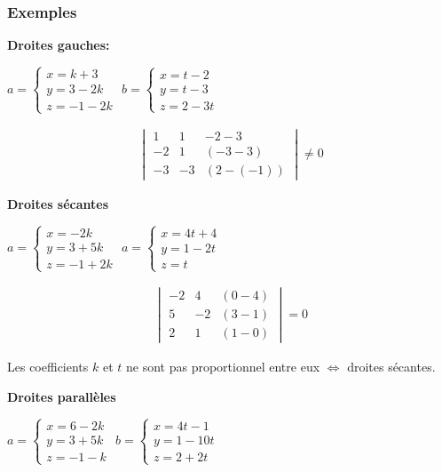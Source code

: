 \documentclass[12pt,a4paper]{report}
\begin{document}
	
	\subsubsection*{Exemples}
	\textbf{Droites gauches:}
	
	$a=\left\{
	\begin{array}{l}
	x=k+3 \\
	y=3-2k \\
	z=-1-2k
	\end{array}
	\right.$ 	
		$b=\left\{
	\begin{array}{l}
	x=t-2 \\
	y=t-3 \\
	z=2-3t
	\end{array}
	\right.$
	
		\begin{gather}
	\begin{vmatrix} 
	1 & 1 & -2-3 \\ 
	-2 & 1 & (-3-3) \\
	-3 & -3 & (2-(-1))
	\end{vmatrix}
	\neq 0 
	\end{gather}
	
	\pagebreak
	
	\textbf{Droites sécantes}
	
		$a=\left\{
	\begin{array}{l}
	x=-2k \\
	y=3+5k \\
	z=-1+2k
	\end{array}
	\right.$
		$a=\left\{
	\begin{array}{l}
	x= 4t+4 \\
	y=1-2t \\
	z=t
	\end{array}
	\right.$  
	
	\begin{gather}
	\begin{vmatrix} 
	-2 & 4 & (0-4) \\ 
	5 & -2 & (3-1) \\
	2 & 1 & (1-0)
	\end{vmatrix}
	= 0 
	\end{gather}
	
	Les coefficients $k$ et $t$ ne sont pas proportionnel entre eux $\Leftrightarrow$ droites sécantes.
	
	\bigskip
	
	\textbf{Droites parallèles}
	
		$a=\left\{
	\begin{array}{l}
	x=6-2k \\
	y=3+5k \\
	z=-1-k
	\end{array}
	\right.$
		$b=\left\{
	\begin{array}{l}
	x=4t-1 \\
	y=1-10t \\
	z=2+2t
	\end{array}
	\right.$
	
\end{document}
